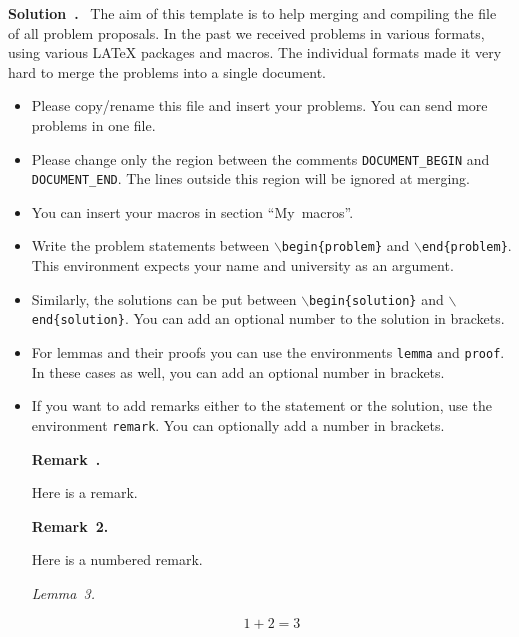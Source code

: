 \documentclass[a4paper,12pt]{article}
\newenvironment{solution}[1][]{%
  \goodbreak\smallskip\par\noindent\textbf{Solution{\if#1\empty\else~#1\fi}.}~}%
{%
  \goodbreak
}
\newenvironment{remark}[1][]{
  \goodbreak\smallskip\par
  \small
  \noindent\textbf{Remark{\if#1\empty\else~#1\fi}.}~%
}{%
  \goodbreak
  \normalsize
}
\newenvironment{lemma}[1][]{
  \goodbreak\smallskip\par
  \noindent\textit{Lemma{\if#1\empty\else~#1\fi}.}~%
}{%
  \goodbreak\smallskip
}
\begin{document}
\begin{solution}
  The aim of this template is to help merging and compiling the file of all
  problem proposals. In the past we received problems in various formats,
  using various LATeX packages and macros. The individual formats made it very
  hard to merge the problems into a single document.

  \begin{itemize}
  \item Please copy/rename this file and insert your problems. You can send
    more problems in one file.
    
  \item Please change only the region between the comments
    \texttt{DOCUMENT\_BEGIN} and \texttt{DOCUMENT\_END}. The lines outside
    this region will be ignored at merging.
    
  \item You can insert your macros in section ``My~macros''.

  \item Write the problem statements between
    \texttt{$\backslash$begin\{problem\}} and
    \texttt{$\backslash$end\{problem\}}. This environment expects your name
    and university as an argument.
    
  \item Similarly, the solutions can be put between
    \texttt{$\backslash$begin\{solution\}} and
    \texttt{$\backslash$end\{solution\}}. You can add an optional number to
    the solution in brackets.
    
  \item For lemmas and their proofs you can use the environments
    \texttt{lemma} and \texttt{proof}. In these cases as well, you can add an
    optional number in brackets.
    
  \item If you want to add remarks either to the statement or the solution,
    use the environment \texttt{remark}. You can optionally add a number in
    brackets.
    
    \begin{remark}
      Here is a remark.
    \end{remark}

    \begin{remark}[2]
      Here is a numbered remark.
    \end{remark}
    
    \begin{lemma}[3]
      \begin{equation}
        1+2=3
        \label{gkos:123}
      \end{equation}
    \end{lemma}
    

\end{itemize}
\end{solution}
\end{document}
